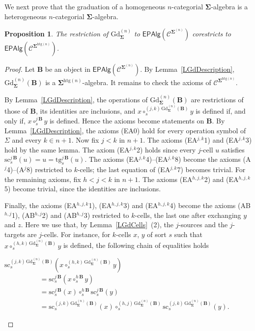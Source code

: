 \documentclass[a4paper, reqno]{amsbook}
\newcommand{\sig}[1]{\mathbf{#1}}             %
\newcommand{\spec}[1]{\boldsymbol{\mathcal{#1}}} %
\newcommand{\htg}{\mathrm{htg}}                %
\newcommand{\src}{\mathrm{sc}}
\newcommand{\tgt}{\mathrm{tg}}
\newcommand{\Gd}{\mathrm{Gd}}
\theoremstyle{plain}
\newtheorem{proposition}[theorem]{Proposition}
\theoremstyle{definition}
\begin{document}
We next prove that the graduation of a homogeneous $n$-categorial $\sig{\Sigma}$-algebra is a heterogeneous $n$-categorial $\sig{\Sigma}$-algebra.

\begin{proposition}\label{PGdEpVariety}
The restriction of $\Gd^{(n)}_{\sig{\Sigma}}$ to $\mathsf{EPAlg}(\spec{C}^{\sig{\Sigma}^{(n)}})$ corestricts to $\mathsf{EPAlg}(\spec{C}^{\sig{\Sigma}^{\htg(n)}})$.
\end{proposition}
\begin{proof}
Let $\mathbf{B}$ be an object in $\mathsf{EPAlg}(\spec{C}^{\sig{\Sigma}^{(n)}})$.
By Lemma~\ref{LGdDescription}, $\Gd^{(n)}_{\sig{\Sigma}}(\mathbf{B})$ is a $\sig{\Sigma}^{\htg(n)}$-algebra.
It remains to check the axioms of $\spec{C}^{\sig{\Sigma}^{\htg(n)}}$.

By Lemma~\ref{LGdDescription}, the operations of $\Gd^{(n)}_{\sig{\Sigma}}(\mathbf{B})$ are restrictions of those of $\mathbf{B}$, its identities are inclusions, and $x\circ^{(j,k)\,\Gd^{(n)}_{\sig{\Sigma}}(\mathbf{B})}_{s}y$ is defined if, and only if, $x\circ^{j\,\mathbf{B}}_{s}y$ is defined.
Hence the axioms become statements on $\mathbf{B}$.
By Lemma~\ref{LGdDescription}, the axioms (EA0) hold for every operation symbol of $\Sigma$ and every $k\in n+1$.
Now fix $j<k$ in $n+1$.
The axioms (EA$^{j,k}$1) and (EA$^{j,k}$3) hold by the same lemma.
The axiom (EA$^{j,k}$2) holds since every $j$-cell $u$ satisfies $\src^{j\,\mathbf{B}}_{s}(u)=u=\tgt^{j\,\mathbf{B}}_{s}(u)$.
The axioms (EA$^{j,k}$4)--(EA$^{j,k}$8) become the axioms (A$^{j}$4)--(A$^{j}$8) restricted to $k$-cells; the last equation of (EA$^{j,k}$7) becomes trivial.
For the remaining axioms, fix $h<j<k$ in $n+1$.
The axioms (EA$^{h,j,k}$2) and (EA$^{h,j,k}$5) become trivial, since the identities are inclusions.

Finally, the axioms (EA$^{h,j,k}$1), (EA$^{h,j,k}$3) and (EA$^{h,j,k}$4) become the axioms (AB$^{h,j}$1), (AB$^{h,j}$2) and (AB$^{h,j}$3) restricted to $k$-cells, the last one after exchanging $y$ and $z$.
Here we use that, by Lemma~\ref{LGdCells}~(2), the $j$-sources and the $j$-targets are $j$-cells.
For instance, for $k$-cells $x$, $y$ of sort $s$ such that $x\circ^{(h,k)\,\Gd^{(n)}_{\sig{\Sigma}}(\mathbf{B})}_{s}y$ is defined, the following chain of equalities holds
\begin{flushleft}
	$\src^{(j,k)\,\Gd^{(n)}_{\sig{\Sigma}}(\mathbf{B})}_{s}\left(x\circ^{(h,k)\,\Gd^{(n)}_{\sig{\Sigma}}(\mathbf{B})}_{s}y\right)$
\begin{align*}
\quad
&=
\src^{j\,\mathbf{B}}_{s}\left(x\circ^{h\,\mathbf{B}}_{s}y\right)
\tag{1}
\\&=
\src^{j\,\mathbf{B}}_{s}(x)\circ^{h\,\mathbf{B}}_{s}\src^{j\,\mathbf{B}}_{s}(y)
\tag{2}
\\&=
\src^{(j,k)\,\Gd^{(n)}_{\sig{\Sigma}}(\mathbf{B})}_{s}(x)
\circ^{(h,j)\,\Gd^{(n)}_{\sig{\Sigma}}(\mathbf{B})}_{s}\src^{(j,k)\,\Gd^{(n)}_{\sig{\Sigma}}(\mathbf{B})}_{s}(y).
\tag{3}
\end{align*}
\end{flushleft}


\end{proof}
\end{document}
